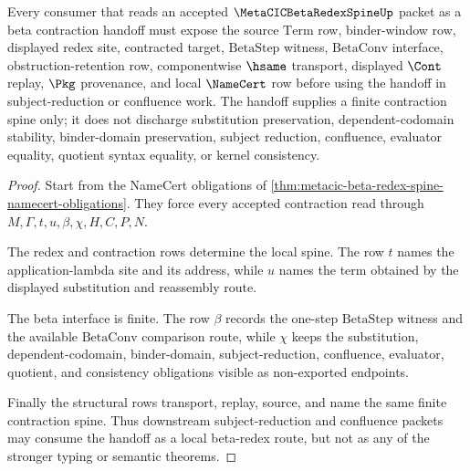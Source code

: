 \begin{theorem}
\label{thm:metacic-beta-redex-spine-contraction-handoff}
Every consumer that reads an accepted $\MetaCICBetaRedexSpineUp$ packet as a beta contraction handoff must expose the source $\mathrm{Term}$ row, binder-window row, displayed redex site, contracted target, $\mathrm{BetaStep}$ witness, $\mathrm{BetaConv}$ interface, obstruction-retention row, componentwise $\hsame$ transport, displayed $\Cont$ replay, $\Pkg$ provenance, and local $\NameCert$ row before using the handoff in subject-reduction or confluence work. The handoff supplies a finite contraction spine only; it does not discharge substitution preservation, dependent-codomain stability, binder-domain preservation, subject reduction, confluence, evaluator equality, quotient syntax equality, or kernel consistency.
\end{theorem}
\begin{proof}
Start from the NameCert obligations of \autoref{thm:metacic-beta-redex-spine-namecert-obligations}. They force every accepted contraction read through $M,\Gamma,t,u,\beta,\chi,H,C,P,N$.

The redex and contraction rows determine the local spine. The row $t$ names the application-lambda site and its address, while $u$ names the term obtained by the displayed substitution and reassembly route.

The beta interface is finite. The row $\beta$ records the one-step $\mathrm{BetaStep}$ witness and the available $\mathrm{BetaConv}$ comparison route, while $\chi$ keeps the substitution, dependent-codomain, binder-domain, subject-reduction, confluence, evaluator, quotient, and consistency obligations visible as non-exported endpoints.

Finally the structural rows transport, replay, source, and name the same finite contraction spine. Thus downstream subject-reduction and confluence packets may consume the handoff as a local beta-redex route, but not as any of the stronger typing or semantic theorems.
\end{proof}



